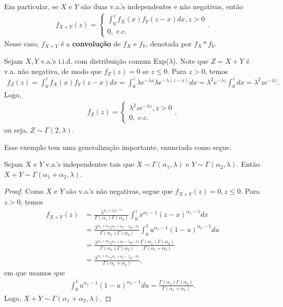 \documentclass[../Notas.tex]{subfiles}
\begin{document}
Em particular, se $X$ e $Y$ são duas v.a.'s independentes e não negativas, então
\begin{align*}
    f_{X+Y}(z) = \begin{cases}
    \int_0^z f_X(x)f_Y(z-x) dx, z > 0 \\
    0, \text{ c.c.}
    \end{cases}.
\end{align*}
Nesse caso, $f_{X+Y}$ é a \textbf{convolução} de $f_X$ e $f_Y$, denotada por $f_X*f_Y$.

\begin{example}
Sejam $X,Y$ v.a.'s i.i.d. com distribuição comum Exp($\lambda$). Note que $Z = X+Y$ é v.a. não negativa, de modo que $f_Z(z) = 0$ se $z\leq 0$. Para $z>0$, temos
\begin{align*}
    f_Z(z) = \int_0^z f_X(x)f_Y(z-x)dx = \int_0^z \lambda e^{-\lambda x}\lambda e^{-\lambda(z-x)} dx = \lambda^2 e^{-\lambda z}\int_0^z dx = \lambda^2 ze^{-\lambda z}.
\end{align*}
Logo,
\begin{align*}
    f_Z(z) = \begin{cases}
    \lambda^2z e^{-\lambda z}, z > 0 \\
    0, \text{ c.c.}
    \end{cases},
\end{align*}
ou seja, $Z\sim\Gamma(2,\lambda)$.
\end{example}

Esse exemplo tem uma generalização importante, enunciada como segue.

\begin{theorem}
Sejam $X$ e $Y$ v.a.'s independentes tais que $X\sim\Gamma(\alpha_1, \lambda)$ e $Y\sim\Gamma(\alpha_2, \lambda)$. Então $X+Y\sim\Gamma(\alpha_1+\alpha_2, \lambda)$.
\end{theorem}
\begin{proof}
Como $X$ e $Y$ são v.a.'s não negativas, segue que $f_{X+Y}(z) = 0, z\leq 0$. Para $z>0$, temos
\begin{align*}
    f_{X+Y}(z) &= \frac{ \lambda^{\alpha_1 + \alpha_2 e^{-\lambda z}} }{\Gamma(\alpha_1)\Gamma(\alpha_2)}\int_0^z x^{\alpha_1 - 1}(z-x)^{\alpha_2 - 1} dx \\
    &= \frac{\lambda^{\alpha_1+\alpha_2} z^{\alpha_1 + \alpha_2 - 1}e^{-\lambda z}}{\Gamma(\alpha_1)\Gamma(\alpha_2)}\int_0^1 u^{\alpha_1 - 1}(1-u)^{\alpha_2 - 1} du \\
    &= \frac{\lambda^{\alpha_1+\alpha_2} z^{\alpha_1 + \alpha_2 - 1}e^{-\lambda z}}{\Gamma(\alpha_1)\Gamma(\alpha_2)}\frac{ \Gamma(\alpha_1)\Gamma(\alpha_2) }{ \Gamma(\alpha_1 + \alpha_2) } \\
    &= \frac{\lambda^{\alpha_1+\alpha_2} z^{\alpha_1 + \alpha_2 - 1}e^{-\lambda z}}{\Gamma(\alpha_1+\alpha_2)},
\end{align*}
em que usamos que
\begin{align*}
    \int_0^1 u^{\alpha_1 - 1}(1-u)^{\alpha_2 - 1} du = \frac{ \Gamma(\alpha_1)\Gamma(\alpha_2) }{ \Gamma(\alpha_1+\alpha_2) }.
\end{align*}
Logo, $X+Y\sim\Gamma(\alpha_1+\alpha_2, \lambda)$.
\end{proof}
\end{document}
